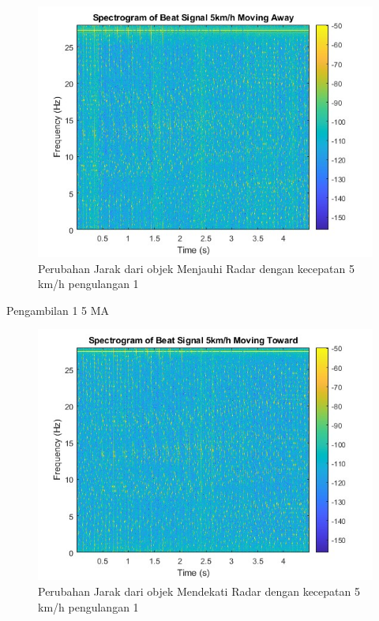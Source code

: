 \begin{figure}
	\centering
	\includegraphics[scale=0.6]{pics/bab5/Velocity/1_5MA.jpg}
	\caption{Perubahan Jarak dari objek Menjauhi Radar dengan kecepatan 5 km/h pengulangan 1}
	\label{fig:pengambilan1_5MA}
\end{figure}

Pengambilan 1 5 MA

\begin{figure}
	\centering
	\includegraphics[scale=0.6]{pics/bab5/Velocity/1_5MT.jpg}
	\caption{Perubahan Jarak dari objek Mendekati Radar dengan kecepatan 5 km/h pengulangan 1}
	\label{fig:pengambilan1_5MT}
\end{figure}

